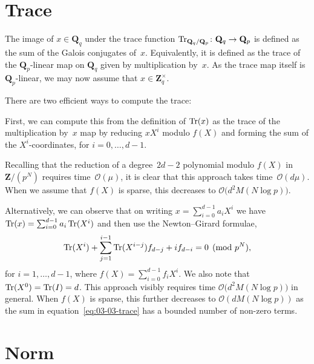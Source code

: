 \section{Trace}

The image of $x \in \mathbf{Q}_q$ under the trace function 
$\operatorname{Tr}_{\mathbf{Q}_q/\mathbf{Q}_p} \colon \mathbf{Q}_q \rightarrow \mathbf{Q}_p$ 
is defined as the sum of the Galois conjugates of~$x$.  Equivalently, 
it is defined as the trace of the $\mathbf{Q}_p$-linear map on 
$\mathbf{Q}_q$ given by multiplication by~$x$.  As the trace map 
itself is $\mathbf{Q}_p$-linear, we may now assume that 
$x \in \mathbf{Z}_q^{\times}$.

There are two efficient ways to compute the trace:

First, we can compute this from the definition of $\operatorname{Tr}(x)$ as the trace 
of the multiplication by~$x$  map by reducing $x X^i$ modulo $f(X)$ and forming 
the sum of the $X^i$-coordinates, for $i = 0, \dotsc, d - 1$.

Recalling that the reduction of a degree~$2d-2$ polynomial modulo 
$f(X)$ in $\mathbf{Z}/(p^N)$ requires time~$\mathcal{O}(\mu)$, 
it is clear that this approach takes time~$\mathcal{O}(d \mu)$. 
When we assume that $f(X)$ is sparse, this decreases to 
$\mathcal{O}\bigl(d^2 M(N \log p)\bigr)$.

Alternatively, we can observe that on writing $x = \sum_{i=0}^{d-1} a_i X^i$ 
we have $\operatorname{Tr}(x) = \sum_{i=0}^{d-1} a_i \operatorname{Tr}(X^i)$ and then use the 
Newton--Girard formulae,
\begin{equation} \label{eq:03-03-trace}
\operatorname{Tr}(X^i) + \sum_{j=1}^{i-1} \operatorname{Tr}(X^{i-j}) f_{d-j} + i f_{d-i} = 0 \pmod{p^N}, 
\end{equation}
for $i = 1, \dotsc, d-1$, where $f(X) = \sum_{i=0}^{d-1} f_i X^i$.  
We also note that $\operatorname{Tr}(X^0) = \operatorname{Tr}(I) = d$.  This approach visibly 
requires time $\mathcal{O}\bigl(d^2 M(N \log p)\bigr)$ in general.  When 
$f(X)$ is sparse, this further decreases to $\mathcal{O}(d M(N \log p))$ as 
the sum in equation~\eqref{eq:03-03-trace} has a bounded number of 
non-zero terms.

\section{Norm}

